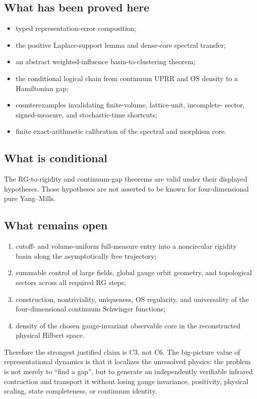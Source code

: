 \documentclass[11pt]{article}
\theoremstyle{remark}
\begin{document}
\subsection*{What has been proved here}
\begin{itemize}
\item typed representation-error composition;
\item the positive Laplace-support lemma and dense-core spectral transfer;
\item an abstract weighted-influence basin-to-clustering theorem;
\item the conditional logical chain from continuum UPRR and OS density to a
      Hamiltonian gap;
\item counterexamples invalidating finite-volume, lattice-unit, incomplete-
      sector, signed-measure, and stochastic-time shortcuts;
\item finite exact-arithmetic calibration of the spectral and morphism core.
\end{itemize}

\subsection*{What is conditional}
The RG-to-rigidity and continuum-gap theorems are valid under their displayed
hypotheses.  Those hypotheses are not asserted to be known for four-dimensional
pure Yang--Mills.

\subsection*{What remains open}
\begin{enumerate}
\item cutoff- and volume-uniform full-measure entry into a noncircular rigidity
      basin along the asymptotically free trajectory;
\item summable control of large fields, global gauge orbit geometry, and
      topological sectors across all required RG steps;
\item construction, nontriviality, uniqueness, OS regularity, and universality
      of the four-dimensional continuum Schwinger functions;
\item density of the chosen gauge-invariant observable core in the reconstructed
      physical Hilbert space.
\end{enumerate}

Therefore the strongest justified claim is C3, not C6.  The big-picture value
of representational dynamics is that it localizes the unresolved physics: the
problem is not merely to ``find a gap'', but to generate an independently
verifiable infrared contraction and transport it without losing gauge
invariance, positivity, physical scaling, state completeness, or continuum
identity.
\end{document}
